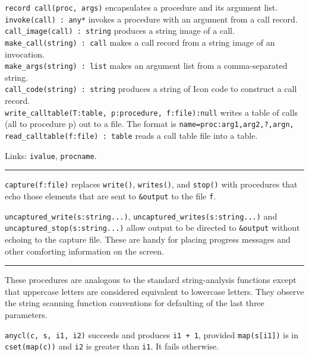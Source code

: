 \texttt{record call(proc, args)} encapsulates a procedure
and its argument list.\\
\texttt{invoke(call) : any*} invokes a procedure with an argument from a
call record.\\
\texttt{call\_image(call) : string} produces a string image of a
call.\\
\texttt{make\_call(string) : call} makes a call record from a string
image of an invocation.\\
\texttt{make\_args(string) : list} makes an argument list from a
comma-separated string.\\
\texttt{call\_code(string) : string} produces a string of Icon code to
construct a call record.\\
\texttt{write\_calltable(T:table, p:procedure, f:file):null} writes a
table of calls (all to procedure p) out to a file. The format is
\texttt{name=proc:arg1,arg2,?,argn,}\\
\texttt{read\_calltable(f:file) : table} reads a call table file into a
table.

Links: \texttt{ivalue}, \texttt{procname}. 

\vspace{0.25cm}\hrule{}

\texttt{capture(f:file)} replaces \texttt{write()}, \texttt{writes()},
and \texttt{stop()} with procedures that echo those elements that are
sent to \texttt{\&output} to the file \texttt{f}.

\texttt{uncaptured\_write(s:string...)},
\texttt{uncaptured\_writes(s:string...)} and \linebreak
\texttt{uncaptured\_stop(s:string...)} allow output to be directed to
\texttt{\&output} without echoing to the capture file. These are handy
for placing progress messages and other comforting information on the
screen.

\pagebreak

\vspace{0.25cm}\hrule{}

These procedures are analogous to the standard string-analysis functions
except that uppercase letters are considered equivalent to lowercase
letters. They observe the string scanning function conventions for
defaulting of the last three parameters.

\texttt{anycl(c, s, i1, i2)} succeeds and produces \texttt{i1 + 1},
provided \texttt{map(s[i1])} is in \texttt{cset(map(c))} and
\texttt{i2} is greater than \texttt{i1}. It fails otherwise.


